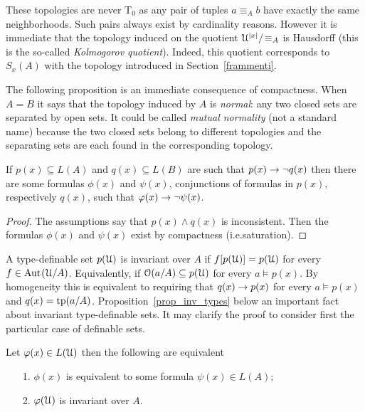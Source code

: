 \documentclass[creche.tex]{subfiles}
\begin{document}
These topologies are never T$_0$ as any pair of tuples $a\equiv_A b$ have exactly the same neighborhoods. Such pairs always exist by cardinality reasons. However it is immediate that the topology induced on the quotient $\EuScript U^{|x|}/\!\equiv_A$ is Hausdorff (this is the so-called \textit{Kolmogorov quotient}). Indeed, this quotient corresponds to $S_x(A)$ with the topology introduced in Section~\ref{frammenti}.

The following proposition is an immediate consequence of compactness. When $A=B$ it says that the topology induced by $A$ is \textit{normal}: any two closed sets are separated by open sets. It could be called \emph{mutual normality\/} (not a standard name) because the two closed sets belong to different topologies and the separating sets are each found in the corresponding topology.

\begin{proposition}\label{prop_normality}
If $p(x)\subseteq L(A)$ and $q(x)\subseteq L(B)$ are such that $p(x)\rightarrow \neg q(x)$ then there are some formulas $\phi(x)$ and $\psi(x)$, conjunctions of formulas in $p(x)$, respectively $q(x)$, such that $\varphi(x)\rightarrow\neg\psi(x)$.
\end{proposition}

\begin{proof}
The assumptions say that $p(x)\wedge q(x)$ is inconsistent. Then the formulas $\phi(x)$ and $\psi(x)$ exist by compactness (i.e.\@ saturation).
\end{proof}

A type-definable set $p(\EuScript U)$ is invariant over $A$ if $f[p(\EuScript U)]=p(\EuScript U)$ for every $f\in\textrm{Aut\kern.15ex}(\EuScript U/A)$. Equivalently, if $\EuScript O(a/A)\subseteq p(\EuScript U)$ for every $a\models p(x)$. By homogeneity this is equivalent to requiring that $q(x)\rightarrow p(x)$ for every $a\models p(x)$ and $q(x)={\rm tp}(a/A)$. Proposition~\ref{prop_inv_types} below an important fact about invariant type-definable sets. It may clarify the proof to consider first the particular case of definable sets.

\begin{proposition}\label{prop_inv_def}
Let $\varphi(x)\in L(\EuScript U)$ then the following are equivalent
\begin{itemize}
 \item[1.] $\phi(x)$ is equivalent to some formula $\psi(x)\in L(A)$;
 \item[2.] $\varphi(\EuScript U)$ is invariant over $A$.
\end{itemize}
\end{proposition}
\end{document}
